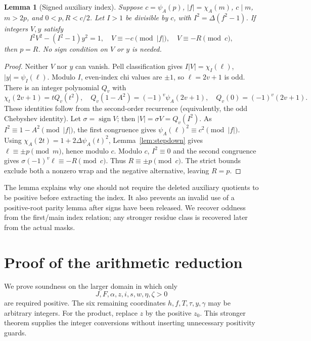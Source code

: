 \documentclass[11pt,a4paper]{article}
\newtheorem{lemma}[theorem]{Lemma}
\theoremstyle{definition}\newtheorem{definition}[theorem]{Definition}
\theoremstyle{remark}\newtheorem{remark}[theorem]{Remark}
\begin{document}
\begin{lemma}[Signed auxiliary index]\label{lem:signed}
Suppose \(c=\psi_A(p)\), \(|f|=\chi_A(m)\), \(c\mid m\),
\(m>2p\), and \(0<p,R<c/2\). Let \(I>1\) be divisible by \(c\),
with \(I^2=\Delta(f^2-1)\). If integers \(V,y\) satisfy
\[
 I^2V^2-(I^2-1)y^2=1,\quad
 V\equiv-c\pmod{|f|},\quad V\equiv-R\pmod c,
\]
then \(p=R\). No sign condition on \(V\) or \(y\) is needed.
\end{lemma}
\begin{proof}
Neither \(V\) nor \(y\) can vanish. Pell classification gives
\(I|V|=\chi_I(\ell)\), \(|y|=\psi_I(\ell)\).
Modulo \(I\), even-index chi values are \(\pm1\), so
\(\ell=2v+1\) is odd. There is an integer polynomial \(Q_v\) with
\[
 \chi_t(2v+1)=tQ_v(t^2),\quad
 Q_v(1-A^2)=(-1)^v\psi_A(2v+1),\quad
 Q_v(0)=(-1)^v(2v+1).
\]
These identities follow from the second-order recurrence (equivalently,
the odd Chebyshev identity). Let \(\sigma=\operatorname{sign}V\);
then \(|V|=\sigma V=Q_v(I^2)\). As \(I^2\equiv1-A^2\pmod{|f|}\),
the first congruence gives \(\psi_A(\ell)^2\equiv c^2\pmod{|f|}\).
Using \(\chi_A(2t)=1+2\Delta\psi_A(t)^2\), Lemma~\ref{lem:stepdown}
gives \(\ell\equiv\pm p\pmod m\), hence modulo \(c\).
Modulo \(c\), \(I^2\equiv0\) and the second congruence gives
\(\sigma(-1)^v\ell\equiv-R\pmod c\). Thus
\(R\equiv\pm p\pmod c\). The strict bounds exclude both a nonzero
wrap and the negative alternative, leaving \(R=p\).
\end{proof}

The lemma explains why one should not require the deleted auxiliary
quotients to be positive before extracting the index. It also prevents
an invalid use of a positive-root parity lemma after signs have been
released. We recover oddness from the first/main index relation; any
stronger residue class is recovered later from the actual masks.

\section{Proof of the arithmetic reduction}
\label{sec:arithmetic-proof}

We prove soundness on the larger domain in which only
\begin{equation}\label{eq:guarded}
 J,F,\alpha,z,i,s,w,\eta,\zeta>0
\end{equation}
are required positive. The six remaining coordinates
\(h,f,T,\tau,y,\gamma\) may be arbitrary integers. For the product,
replace \(z\) by the positive \(z_0\). This stronger theorem supplies
the integer conversions without inserting unnecessary positivity guards.
\end{document}

